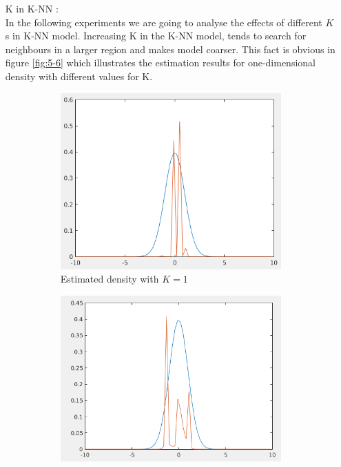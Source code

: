 \documentclass[12pt]{article}
\begin{document}
\begin{itemize}
\item[K in K-NN] :\\
In the following experiments we are going to analyse the effects of different $K$s in K-NN model. Increasing K in the K-NN model, tends to search for neighbours in a larger region and makes model coarser. This fact is obvious in figure \ref{fig:5-6} which illustrates the estimation results for one-dimensional density with different values for K.


\begin{figure}
\centering
\begin{subfigure}{0.45\textwidth}
\centering
\includegraphics[scale=0.35]{Imgs/5-12.png}
\caption{Estimated density with $K = 1$}
\end{subfigure}
\begin{subfigure}{0.45\textwidth}
\centering
\includegraphics[scale=0.35]{Imgs/5-13.png}

\end{subfigure}
\end{figure}
\end{itemize}
\end{document}
